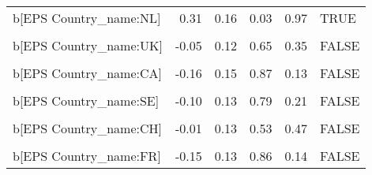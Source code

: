 \begin{table}
\begin{tabular}[t]{lrrrrl}
b[EPS Country\_name:NL] & 0.31 & 0.16 & 0.03 & 0.97 & TRUE\\
\cellcolor{gray!10}{b[(Intercept) Country\_name:UK]} & \cellcolor{gray!10}{-0.03} & \cellcolor{gray!10}{0.33} & \cellcolor{gray!10}{0.54} & \cellcolor{gray!10}{0.46} & \cellcolor{gray!10}{FALSE}\\
b[EPS Country\_name:UK] & -0.05 & 0.12 & 0.65 & 0.35 & FALSE\\
\cellcolor{gray!10}{b[(Intercept) Country\_name:CA]} & \cellcolor{gray!10}{-0.13} & \cellcolor{gray!10}{0.38} & \cellcolor{gray!10}{0.64} & \cellcolor{gray!10}{0.36} & \cellcolor{gray!10}{FALSE}\\
b[EPS Country\_name:CA] & -0.16 & 0.15 & 0.87 & 0.13 & FALSE\\
\cellcolor{gray!10}{b[(Intercept) Country\_name:SE]} & \cellcolor{gray!10}{-0.06} & \cellcolor{gray!10}{0.35} & \cellcolor{gray!10}{0.57} & \cellcolor{gray!10}{0.43} & \cellcolor{gray!10}{FALSE}\\
b[EPS Country\_name:SE] & -0.10 & 0.13 & 0.79 & 0.21 & FALSE\\
\cellcolor{gray!10}{b[(Intercept) Country\_name:CH]} & \cellcolor{gray!10}{0.00} & \cellcolor{gray!10}{0.37} & \cellcolor{gray!10}{0.50} & \cellcolor{gray!10}{0.50} & \cellcolor{gray!10}{FALSE}\\
b[EPS Country\_name:CH] & -0.01 & 0.13 & 0.53 & 0.47 & FALSE\\
\cellcolor{gray!10}{b[(Intercept) Country\_name:FR]} & \cellcolor{gray!10}{-0.09} & \cellcolor{gray!10}{0.40} & \cellcolor{gray!10}{0.59} & \cellcolor{gray!10}{0.41} & \cellcolor{gray!10}{FALSE}\\
b[EPS Country\_name:FR] & -0.15 & 0.13 & 0.86 & 0.14 & FALSE\\
\bottomrule
\end{tabular}
\end{table}
